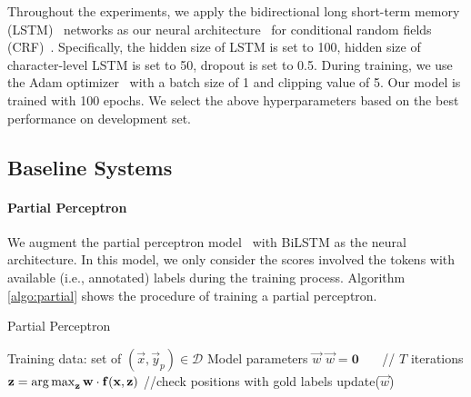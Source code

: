 Throughout the experiments, we apply the bidirectional long short-term memory (LSTM)~\cite{hochreiter1997long} networks as our neural architecture~\cite{lample2016neural} for conditional random fields (CRF)~\cite{lafferty2001conditional}. 
Specifically, the hidden size of LSTM is set to 100, hidden size of character-level LSTM is set to 50, dropout is set to 0.5.
During training, we use the Adam optimizer~\cite{kingma2014adam} with a batch size of 1 and clipping value of 5.
Our model is trained with 100 epochs. We select the above hyperparameters based on the best performance on development set. 

\subsection{Baseline Systems}

\paragraph{Partial Perceptron}
We augment the partial perceptron model~\cite{carlson2009learning} with BiLSTM as the neural architecture. 
In this model, we only consider the scores involved the tokens with available (i.e., annotated) labels during the training process. 
Algorithm \ref{algo:partial} shows the procedure of training a partial perceptron. 

\begin{algorithm}[t!]
	\caption{Partial Perceptron}
	\label{algo:partial}
	\begin{algorithmic}[1]
		\Require Training data: set of $(\vec{x}, \vec{y}_p) \in \mathcal{D}$
		\Ensure Model parameters $\vec{w}$
		\State $\vec{w}=\mathbf{0}$
		 ~~~// $T$ iterations
		\State $\mathbf{z} = \operatorname*{arg\,max}_{\mathbf{z}} \mathbf{w} \cdot \mathbf{f}(\mathbf{x}, \mathbf{z})$
		\State//check positions with gold labels
		\State update($\vec{w}$)
		\EndIf
		\EndFor
		\EndFor
	\end{algorithmic}
\end{algorithm}


